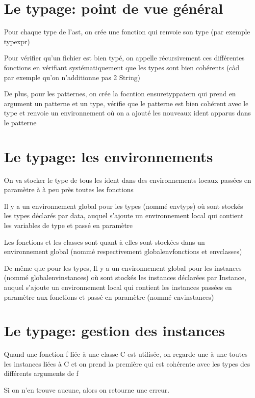 \documentclass[12pt,a4paper,french]{article}
\begin{document}
\part*{Le typage: point de vue général}

Pour chaque type de l'ast, on crée une fonction qui renvoie son type (par exemple typexpr)

Pour vérifier qu'un fichier est bien typé, on appelle récursivement ces différentes fonctions en vérifiant systématiquement
que les types sont bien cohérents (càd par exemple qu'on n'additionne pas 2 String)

De plus, pour les patternes, on crée la focntion ensuretyppatern qui prend en argument un patterne et un type, vérifie
que le patterne est bien cohérent avec le type et renvoie un environnement où on a ajouté les nouveaux ident apparus dans le patterne


\part*{Le typage: les environnements}

On va stocker le type de tous les ident dans des environnements locaux passées en paramètre à à peu près toutes les fonctions

Il y a un environnement global pour les types (nommé envtyps) où sont stockés les types déclarés par data, auquel s'ajoute un environnement
local qui contient les variables de type et passé en paramètre

Les fonctions et les classes sont quant à elles sont stockées dans un environnement global (nommé respectivement globalenvfonctions et envclasses)

De même que pour les types, Il y a un environnement global pour les instances (nommé globalenvinstances) où sont stockés les instances déclarées par Instance, auquel s'ajoute un environnement
local qui contient les instances passées en paramètre aux fonctions et passé en paramètre (nommé envinstances)

\part*{Le typage: gestion des instances}

Quand une fonction f liée à une classe C est utilisée, on regarde une à une toutes les instances liées à C et on prend la
première qui est cohérente avec les types des différents arguments de f

Si on n'en trouve aucune, alors on retourne une erreur.
\end{document}
